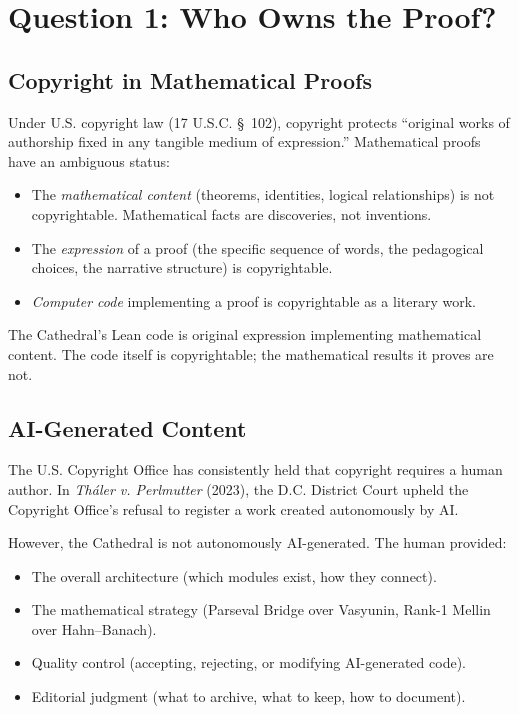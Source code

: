 \documentclass[11pt,a4paper]{article}
\begin{document}
\section{Question 1: Who Owns the Proof?}
\label{sec:ownership}

\subsection{Copyright in Mathematical Proofs}

Under U.S. copyright law (17 U.S.C. \S~102), copyright protects
``original works of authorship fixed in any tangible medium of
expression.'' Mathematical proofs have an ambiguous status:

\begin{itemize}
  \item The \emph{mathematical content} (theorems, identities,
    logical relationships) is not copyrightable. Mathematical
    facts are discoveries, not inventions.
  \item The \emph{expression} of a proof (the specific sequence
    of words, the pedagogical choices, the narrative structure)
    is copyrightable.
  \item \emph{Computer code} implementing a proof is copyrightable
    as a literary work.
\end{itemize}

The Cathedral's Lean code is original expression implementing
mathematical content. The code itself is copyrightable; the
mathematical results it proves are not.

\subsection{AI-Generated Content}

The U.S. Copyright Office has consistently held that copyright
requires a human author. In \emph{Th\'aler v. Perlmutter} (2023),
the D.C. District Court upheld the Copyright Office's refusal to
register a work created autonomously by AI.

However, the Cathedral is not autonomously AI-generated. The human
provided:
\begin{itemize}
  \item The overall architecture (which modules exist, how they
    connect).
  \item The mathematical strategy (Parseval Bridge over Vasyunin,
    Rank-1 Mellin over Hahn--Banach).
  \item Quality control (accepting, rejecting, or modifying
    AI-generated code).
  \item Editorial judgment (what to archive, what to keep, how
    to document).
\end{itemize}
\end{document}

